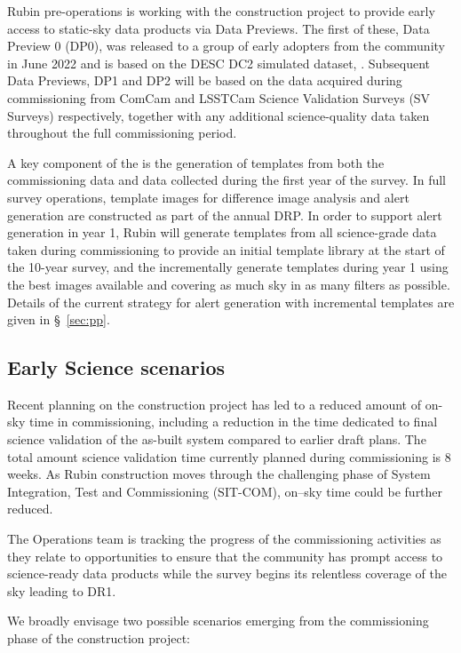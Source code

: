 Rubin pre-operations is working with the construction project to provide early access to static-sky data products via Data Previews. 
The first of these, Data Preview 0 (DP0), was released to a group of early adopters from the community in June 2022 and is based on the DESC DC2 simulated dataset, \citep{2021ApJS..253...31L}. 
Subsequent Data Previews, DP1 and DP2 will be based on the data acquired during  commissioning from ComCam and LSSTCam Science Validation Surveys (SV Surveys) respectively, together with any additional science-quality data taken throughout the full commissioning period.

A key component of the \esp is the generation of templates from both the commissioning data and data collected during the first year of the survey.
In full survey operations, template images for difference image analysis and alert generation are constructed as part of the annual DRP.
In order to support alert generation in year 1, Rubin will generate templates from all science-grade data taken during commissioning to provide an initial template library at the start of the 10-year survey, and the incrementally generate templates during year 1 using the best images available and covering as much sky in as many filters as possible.
Details of the current strategy for alert generation  with incremental templates are given in  \S~\ref{sec:pp}.


\subsection{Early Science scenarios } \label{ssec:scenarios}

Recent planning on the construction project has led to a reduced amount of on-sky time in commissioning, including a reduction in the time dedicated to final science validation of the as-built system compared to earlier draft plans.
The total amount science validation time currently planned during commissioning is 8 weeks. 
As Rubin construction moves through the challenging phase of System Integration, Test and Commissioning (SIT-COM), on--sky time could be further reduced.

The Operations team is tracking the progress of the commissioning activities as they relate to \es opportunities to ensure that the community has prompt access to science-ready data products while the survey begins its relentless coverage of the sky leading to DR1.

We broadly envisage two possible scenarios emerging from the commissioning phase of the construction project: 

